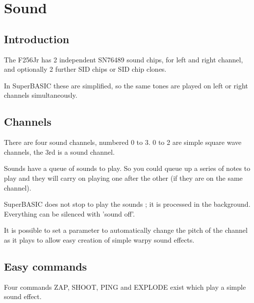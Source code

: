\chapter{Sound}

\section{Introduction}

The F256Jr has 2 independent SN76489 sound chips, for left and right channel, and optionally 2 further SID chips or SID chip clones.

In SuperBASIC these are simplified, so the same tones are played on left or right channels simultaneously.

\section{Channels}

There are four sound channels, numbered 0 to 3. 0 to 2 are simple square wave channels, the 3rd is a sound channel.

Sounds have a queue of sounds to play. So you could queue up a series of notes to play and they will carry on playing one after the other (if they are on the same channel). 

SuperBASIC does not stop to play the sounds ; it is processed in the background. Everything can be silenced with 'sound off'.

It is possible to set a parameter to automatically change the pitch of the channel as it plays to allow easy creation of simple warpy sound effects.

\section{Easy commands}

Four commands ZAP, SHOOT, PING and EXPLODE exist which play a simple sound effect.




